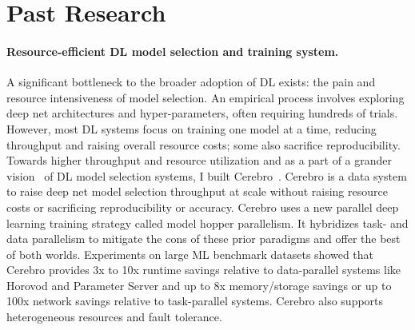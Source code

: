 \documentclass[letterpaper]{article}
\begin{document}
\section*{Past Research}


\paragraph{Resource-efficient DL model selection and training system.} A significant bottleneck to the broader adoption of DL exists: the pain and resource intensiveness of model selection. An empirical process involves exploring deep net architectures and hyper-parameters, often requiring hundreds of trials. However, most DL systems focus on training one model at a time, reducing throughput and raising overall resource costs; some also sacrifice reproducibility. Towards higher throughput and resource utilization and as a part of a grander vision~\cite{cerebrocidr, kdd} of DL model selection systems, I built Cerebro~\cite{cerebro}. Cerebro is a data system to raise deep net model selection throughput at scale without raising resource costs or sacrificing reproducibility or accuracy. Cerebro uses a new parallel deep learning training strategy called model hopper parallelism. It hybridizes task- and data parallelism to mitigate the cons of these prior paradigms and offer the best of both worlds. Experiments on large ML benchmark datasets showed that Cerebro provides 3x to 10x runtime savings relative to data-parallel systems like Horovod and Parameter Server and up to 8x memory/storage savings or up to 100x network savings relative to task-parallel systems. Cerebro also supports heterogeneous resources and fault tolerance.
\end{document}
